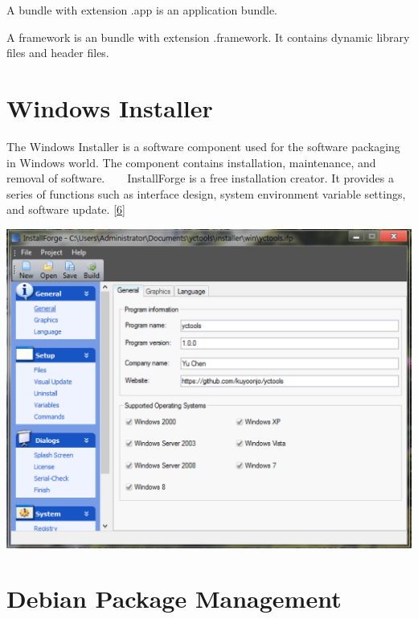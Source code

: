 \begin{DoxyItemize}
\item A bundle with extension .app is an application bundle.
\item A framework is an bundle with extension .framework. It contains dynamic library files and header files.
\end{DoxyItemize}\hypertarget{_software_packaging_SoftwarePackagingWindowsInstaller}{}\section{Windows Installer}\label{_software_packaging_SoftwarePackagingWindowsInstaller}
The Windows Installer is a software component used for the software packaging in Windows world. The component contains installation, maintenance, and removal of software. ~\newline
~\newline
Install\+Forge is a free installation creator. It provides a series of functions such as interface design, system environment variable settings, and software update. \mbox{[}\hyperlink{_reference_r6}{6}\mbox{]} 
\begin{DoxyImageNoCaption}
  \mbox{\includegraphics[width=\textwidth,height=\textheight/2,keepaspectratio=true]{ResearchInstallForge.png}}
\end{DoxyImageNoCaption}
\hypertarget{_software_packaging_SoftwarePackagingDebianPackageManagement}{}\section{Debian Package Management}\label{_software_packaging_SoftwarePackagingDebianPackageManagement}
